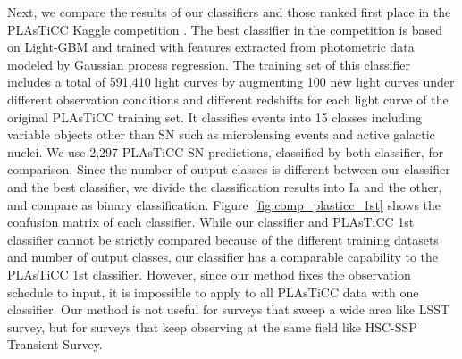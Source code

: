 \documentclass[proof]{pasj01}
\begin{document}
Next, we compare the results of our classifiers and those ranked first place in the PLAsTiCC Kaggle competition \citep{malz19a}.
The best classifier in the competition \citep{boone19a} is based on Light-GBM and trained with features extracted from photometric data modeled by Gaussian process regression.
The training set of this classifier includes a total of 591,410 light curves by augmenting 100 new light curves under different observation conditions and different redshifts for each light curve of the original PLAsTiCC training set.
It classifies events into 15 classes including variable objects other than SN such as microlensing events and active galactic nuclei.
We use 2,297 PLAsTiCC SN predictions, classified by both classifier, for comparison.
Since the number of output classes is different between our classifier and the best classifier, we divide the classification results into Ia and the other, and compare as binary classification.
Figure\ \ref{fig:comp_plasticc_1st} shows the confusion matrix of each classifier.
While our classifier and PLAsTiCC 1st classifier cannot be strictly compared because of the different training datasets and number of output classes,
our classifier has a comparable capability to the PLAsTiCC 1st classifier.
However, since our method fixes the observation schedule to input, it is impossible to apply to all PLAsTiCC data with one classifier.
Our method is not useful for surveys that sweep a wide area like LSST survey, but for surveys that keep observing at the same field like HSC-SSP Transient Survey.
%
\end{document}
